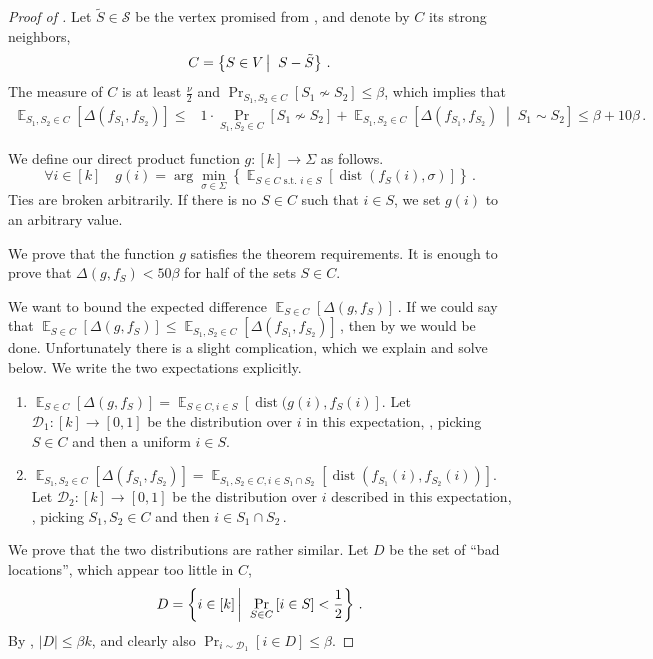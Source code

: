 \documentclass{toc}
\newcommand{\Prob}[2][]{\Pr_{{#1}}\left[#2\right]} %
\DeclareMathOperator*{\E}{\mathbb{E}} %
\newcommand{\Ex}[2][]{\E_{{#1}}\Brac{#2}} %
\newcommand{\Brac}[1]{\left[#1\right]} %
\newcommand{\abs}[1]{\lvert#1\rvert} %
\newcommand{\given}{\;\middle\vert\;} %
\newcommand\sett[2]{\left\{ #1 \left| \; \vphantom{#1 #2} \right. #2  \right\}} %
\newcommand{\Set}[1]{\left\{#1\right\}} %
\newcommand\f{f} %
\newcommand\setf{f} %
\newcommand\pf{g} %
\DeclareMathOperator{\dist}{dist} %
\newcommand{\diff}{\Delta} %
\newcommand\wconn{\sim} %
\newcommand\sconn{-} %
\begin{document}
\begin{proof}[Proof of ]
	Let $\tilde{S}\in\mathcal{S}$ be the vertex promised from , and denote by $C$ its strong neighbors,
	\[C = \sett{S\in V}{S\sconn \tilde{S}}\,. \] %
	The measure of $C$ is at least $\frac{\nu}{2}$ and $\Pr_{S_1,S_2\in C}[S_1\not\wconn S_2]\leq \beta$, which implies that
	\begin{align}\label{eq:clique-consistency}
	 \Ex[S_1,S_2\in C]{\diff(\setf_{S_1},\setf_{S_2})} \leq& 1\cdot\Prob[S_1,S_2\in C]{S_1\not\wconn S_2} + \Ex[S_1, S_2\in C]{\diff(\setf_{S_1},\setf_{S_2}) \given S_1\wconn S_2}  \leq \beta+10\beta \,.  %
	\end{align}
	
	We define our direct product function $\pf:[k]\rightarrow \Sigma$ as follows. 
	\[ \forall i\in[k] \quad \pf(i) = \arg\min_{\sigma\in\Sigma}\Set{\E_{S\in C \text{ s.t. } i\in S}[\dist(\setf_S(i),\sigma)]  }\,. \] %
	Ties are broken arbitrarily. If there is no $S\in C$ such that $i\in S$, we set $\pf(i)$ to an arbitrary value.
	
    We prove that the function $\pf$ satisfies the theorem requirements. It is enough to prove that $\Delta(\pf,\f_S) < 50\beta$ for half of the sets $S\in C$.
	
We want to bound the expected difference $\E_{S\in C}[\Delta(\pf,\f_S)]$\,.
	If we could say that $\E_{S\in C}[\Delta(\pf,\f_S)] \leq \E_{S_1,S_2\in C}[\Delta(\f_{S_1},\f_{S_2})]$\,, then by  we would be done. Unfortunately there is a slight complication, which we explain and solve below.
	We write the two expectations explicitly.
    \begin{enumerate}
        \item $\E_{S\in C}[\Delta(\pf,\f_S)] = \E_{S\in C, i\in S}[\dist(\pf(i),\f_S(i)].$ Let $\mathcal{D}_1:[k]\rightarrow[0,1]$ be the distribution over $i$ in this expectation, \ie, picking $S\in C$ and then a uniform 
%
$i\in S$.   %
        \item $\E_{S_1,S_2\in C}[\Delta(\f_{S_1},\f_{S_2})] = \E_{S_1,S_2\in C, i\in S_1\cap S_2}[\dist(\f_{S_1}(i),\f_{S_2}(i))].$ Let $\mathcal{D}_2:[k]\rightarrow[0,1]$ be the distribution over $i$ described in this expectation, \ie, picking $S_1, S_2\in C$ and then $i\in S_1\cap S_2\,.$
    \end{enumerate}
	We prove that the two distributions are rather similar.
	Let $D$ be the set of ``bad locations'', which appear too little in $C$,
	\[ D = \sett{i\in [k]}{\Prob[S\in C]{i\in S}< \frac{1}{2}}\,.\] %
	By , $\abs{D}\leq \beta k$, and clearly also $\Pr_{i\sim\mathcal{D}_1}[i\in D]\leq \beta$. 
	

\end{proof}
\end{document}
